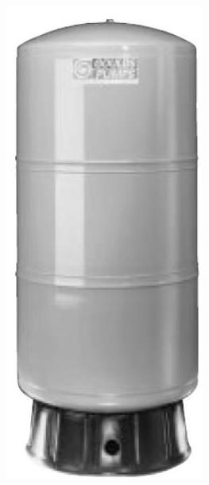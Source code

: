 \documentclass[10pt]{article}
\begin{document}
\includegraphics[max width=\textwidth]{HydropnuematicTank}
\end{document}
